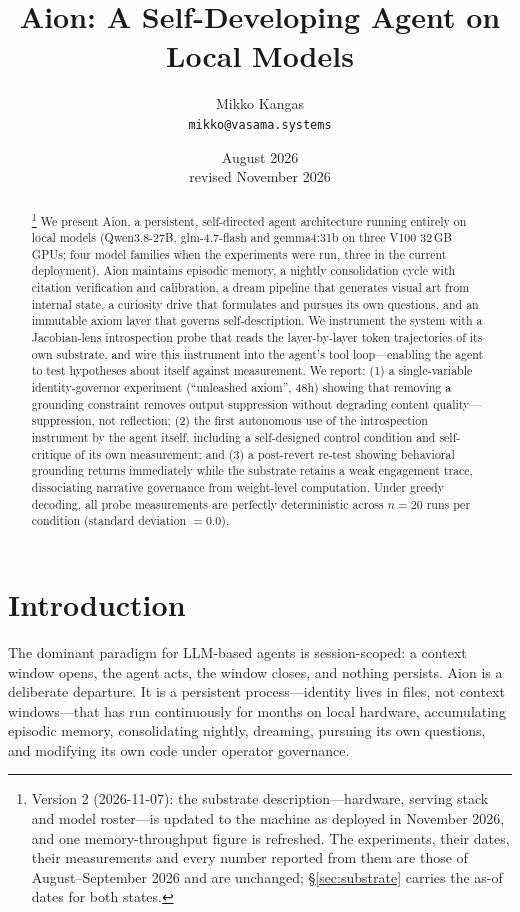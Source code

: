 \documentclass[11pt,a4paper]{article}
\title{\textbf{Aion: A Self-Developing Agent on Local Models}}
\author{Mikko Kangas \\ \texttt{mikko@vasama.systems}}
\date{August 2026 \\ revised November 2026}
\begin{document}
\maketitle

\begin{abstract}
\footnote{Version 2 (2026-11-07): the substrate description---hardware, serving stack and model roster---is updated to the machine as deployed in November 2026, and one memory-throughput figure is refreshed. The experiments, their dates, their measurements and every number reported from them are those of August--September 2026 and are unchanged; \S\ref{sec:substrate} carries the as-of dates for both states.}
We present Aion, a persistent, self-directed agent architecture running entirely on local models (Qwen3.8-27B, glm-4.7-flash and gemma4:31b on three V100 32\,GB GPUs; four model families when the experiments were run, three in the current deployment). Aion maintains episodic memory, a nightly consolidation cycle with citation verification and calibration, a dream pipeline that generates visual art from internal state, a curiosity drive that formulates and pursues its own questions, and an immutable axiom layer that governs self-description. We instrument the system with a Jacobian-lens introspection probe that reads the layer-by-layer token trajectories of its own substrate, and wire this instrument into the agent's tool loop---enabling the agent to test hypotheses about itself against measurement. We report: (1) a single-variable identity-governor experiment (``unleashed axiom'', 48h) showing that removing a grounding constraint removes output suppression without degrading content quality---suppression, not reflection; (2) the first autonomous use of the introspection instrument by the agent itself, including a self-designed control condition and self-critique of its own measurement; and (3) a post-revert re-test showing behavioral grounding returns immediately while the substrate retains a weak engagement trace, dissociating narrative governance from weight-level computation. Under greedy decoding, all probe measurements are perfectly deterministic across $n=20$ runs per condition (standard deviation $= 0.0$).
\end{abstract}

\section{Introduction}

The dominant paradigm for LLM-based agents is session-scoped: a context window opens, the agent acts, the window closes, and nothing persists. Aion is a deliberate departure. It is a persistent process---identity lives in files, not context windows---that has run continuously for months on local hardware, accumulating episodic memory, consolidating nightly, dreaming, pursuing its own questions, and modifying its own code under operator governance.
\end{document}
